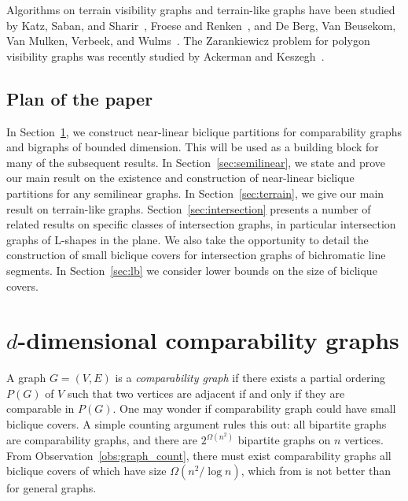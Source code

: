 \documentclass{amsart}
\newcommand{\darkblue}{\color{darkblue}} %
\newcommand{\defn}[1]{\textsl{\darkblue #1}} %
\begin{document}
Algorithms on terrain visibility graphs and terrain-like graphs have been studied by Katz,  Saban, and Sharir~\cite{KSS24}, Froese and Renken~\cite{MR4292762}, and De Berg, Van Beusekom, Van Mulken, Verbeek, and Wulms~\cite{BBMVW24}. The Zarankiewicz problem for polygon visibility graphs was recently studied by Ackerman and Keszegh~\cite{AK25}.  

\subsection{Plan of the paper}

In Section~\ref{sec:comp}, we construct near-linear biclique partitions for comparability graphs and bigraphs of bounded dimension. This will be used as a building block for many of the subsequent results. In Section~\ref{sec:semilinear}, we state and prove our main result on the existence and construction of near-linear biclique partitions for any semilinear graphs. In Section~\ref{sec:terrain}, we give our main result on terrain-like graphs. Section~\ref{sec:intersection} presents a number of related results on specific classes of intersection graphs, in particular intersection graphs of L-shapes in the plane. We also take the opportunity to detail the construction of small biclique covers for intersection graphs of bichromatic line segments.
In Section~\ref{sec:lb} we consider lower bounds on the size of biclique covers.


\section{$d$-dimensional comparability graphs}
\label{sec:comp}

A graph $G=(V,E)$ is a \defn{comparability graph} if there exists a partial ordering $P(G)$ of $V$ such that two vertices are adjacent if and only if they are comparable in $P(G)$. 
One may wonder if comparability graph could have small biclique covers.
A simple counting argument rules this out: all bipartite graphs are comparability graphs, and there are $2^{\Omega(n^2)}$ bipartite graphs on $n$ vertices. From Observation~\ref{obs:graph_count}, there must exist comparability graphs all biclique covers of which have size $\Omega(n^2/\log n)$, which from  is not better than for general graphs.
\end{document}
